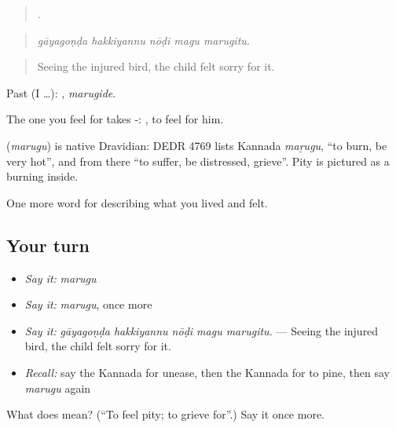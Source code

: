 \begin{quote}
    .
\end{quote}

\begin{quote}
\emph{gāyagoṇḍa hakkiyannu nōḍi magu marugitu.}
\end{quote}

\begin{quote}
Seeing the injured bird, the child felt sorry for it.
\end{quote}

Past (I …): , \emph{marugide}.

The one you feel for takes -:  , to feel for him.

\begin{cousinweb}
\textbf{} (\emph{marugu}) is native Dravidian: DEDR 4769 lists Kannada \emph{maṟugu}, \textquotedblleft{}to burn, be very hot\textquotedblright{}, and from there \textquotedblleft{}to suffer, be distressed, grieve\textquotedblright{}. Pity is pictured as a burning inside.
\end{cousinweb}

\begin{grammarlens}[title={What you've built}]
One more word for describing what you lived and felt.
\end{grammarlens}

\subsection*{Your turn}
\begin{itemize}
\raggedright
  \item \emph{Say it:} \emph{marugu}
  \item \emph{Say it:} \emph{marugu}, once more
  \item \emph{Say it:} \emph{gāyagoṇḍa hakkiyannu nōḍi magu marugitu.} — Seeing the injured bird, the child felt sorry for it.
  \item \emph{Recall:} say the Kannada for unease, then the Kannada for to pine, then say \emph{marugu} again
\end{itemize}

\begin{tcolorbox}[breakable,colback=teal!4,colframe=teal!35!black,title={Before you move on}]
What does  mean? (\textquotedblleft{}To feel pity; to grieve for\textquotedblright{}.) Say it once more.
\end{tcolorbox}
